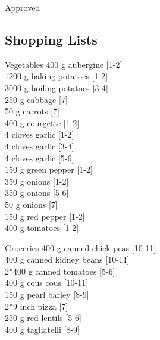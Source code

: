 \begin{menu}{Approved}
    \subsection*{Shopping Lists}
      \begin{shoppinglist}{Vegetables}
      400 g aubergine 
        {\scriptsize[1-2]}\\
      1200 g baking potatoes 
        {\scriptsize[1-2]}\\
      3000 g boiling potatoes 
        {\scriptsize[3-4]}\\
      250 g cabbage 
        {\scriptsize[7]}\\
      50 g carrots 
        {\scriptsize[7]}\\
      400 g courgette 
        {\scriptsize[1-2]}\\
      4 cloves garlic 
        {\scriptsize[1-2]}\\
      4 cloves garlic 
        {\scriptsize[3-4]}\\
      4 cloves garlic 
        {\scriptsize[5-6]}\\
      150 g green pepper 
        {\scriptsize[1-2]}\\
      350 g onions 
        {\scriptsize[1-2]}\\
      350 g onions 
        {\scriptsize[5-6]}\\
      50 g onions 
        {\scriptsize[7]}\\
      150 g red pepper 
        {\scriptsize[1-2]}\\
      400 g tomatoes 
        {\scriptsize[1-2]}\\
      \end{shoppinglist}%
      \begin{shoppinglist}{Groceries}
      400 g canned chick peas 
        {\scriptsize[10-11]}\\
      400 g canned kidney beans 
        {\scriptsize[10-11]}\\
      2*400 g canned tomatoes 
        {\scriptsize[5-6]}\\
      400 g cous cous 
        {\scriptsize[10-11]}\\
      150 g pearl barley 
        {\scriptsize[8-9]}\\
      2*9 inch pizza 
        {\scriptsize[7]}\\
      250 g red lentils 
        {\scriptsize[5-6]}\\
      400 g tagliatelli 
        {\scriptsize[8-9]}\\

\end{shoppinglist}
\end{menu}

